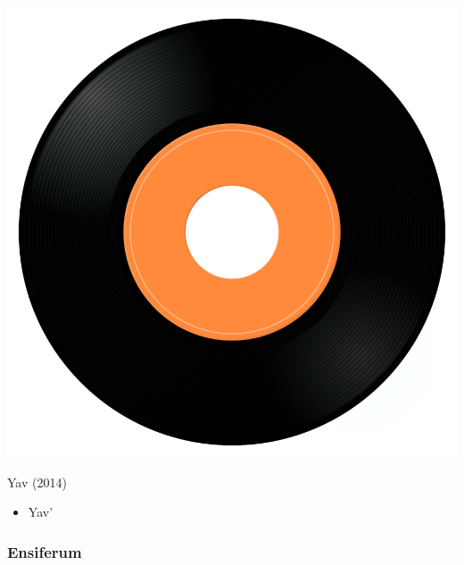 \begin{minipage}[t]{0.25\textwidth}
\captionsetup{type=figure}
\includegraphics[width=\textwidth]{Images/cover.png}
\caption*{Yav (2014)}
\end{minipage}
\begin{minipage}[t]{0.25\textwidth}\vspace{0pt}
\begin{itemize}[nosep,leftmargin=1em,labelwidth=*,align=left]
	\setlength{\itemsep}{0pt}
	\item Yav'
\end{itemize}
\end{minipage}

\subsubsection{Ensiferum}

